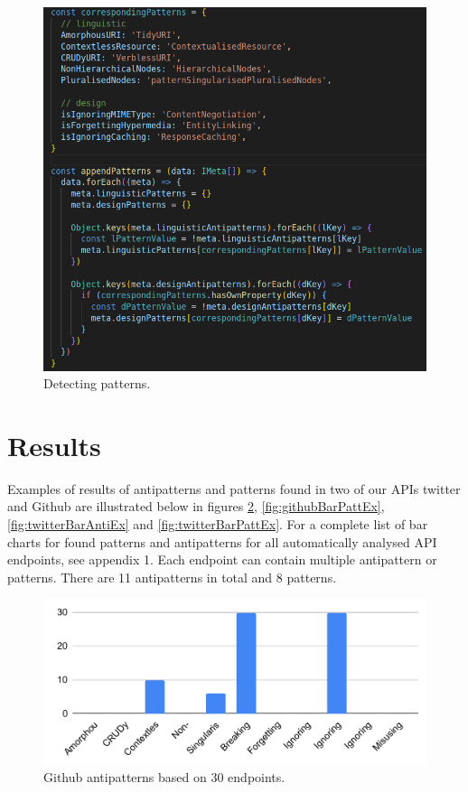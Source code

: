 \documentclass[a4paper,12pt]{article}
\begin{document}
\begin{center}
\begin{figure}[!hbt]
\includegraphics[keepaspectratio,scale=0.5]{Template_report_LaTeX_EN/img/patternsFunction.png}
    \caption{Detecting patterns.}
    \label{fig:Detecting patterns}
\end{figure}
\end{center}
\clearpage

\newpage

\section{Results}

Examples of results of antipatterns and patterns found in two of our APIs twitter and Github are illustrated below in figures \ref{fig:githubBarAntiEx}, \ref{fig:githubBarPattEx}, \ref{fig:twitterBarAntiEx} and \ref{fig:twitterBarPattEx}. For a complete list of bar charts for found patterns and antipatterns for all automatically analysed API endpoints, see appendix 1. Each endpoint can contain multiple antipattern or patterns. There are 11 antipatterns in total and 8 patterns.

\begin{figure}[!h]
\begin{center}
\includegraphics[keepaspectratio,scale=0.8]{Template_report_LaTeX_EN/img/barchart/githubBarAnti.pdf}
\caption{Github antipatterns based on 30 endpoints.}
\label{fig:githubBarAntiEx}
\end{center}
\end{figure}
\end{document}

